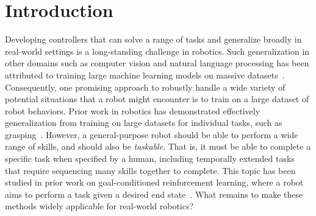 \section{Introduction}

Developing controllers that can solve a range of tasks and generalize broadly in real-world settings is a long-standing challenge in robotics.
Such generalization in other domains such as computer vision and natural language processing has been attributed to training large machine learning models on massive datasets~\citep{krizhevsky2012imagenet}.
Consequently, one promising approach to robustly handle a wide variety of potential situations that a robot might encounter is to train on a large dataset of robot behaviors.
Prior work in robotics has demonstrated effectively generalization from training on large datasets for individual tasks, such as grasping~\citep{levine2017grasping, yu2021conservative}.
However, a general-purpose robot should be able to perform a wide range of skills, and should also be \textit{taskable}.
That is, it must be able to complete a specific task when specified by a human, including temporally extended tasks that require sequencing many skills together to complete.
This topic has been studied in prior work on goal-conditioned reinforcement learning, where a robot aims to perform a task given a desired end state~\citep{Khazatsky2021WhatCI, chebotar2021actionable, kalashnikov2021mtopt}.
What remains to make these methods widely applicable for real-world robotics?

